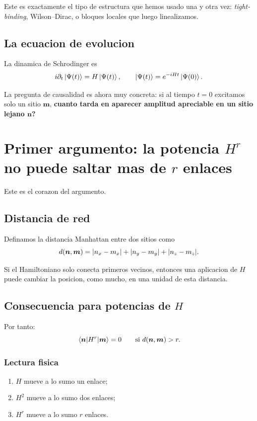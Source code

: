 Este es exactamente el tipo de estructura que hemos usado una y otra vez: \textit{tight-binding}, Wilson--Dirac, o bloques locales que luego linealizamos.

\subsection{La ecuacion de evolucion}
La dinamica de Schrodinger es
\begin{equation}
i\partial_t \ket{\Psi(t)} = H\ket{\Psi(t)},
\qquad
\ket{\Psi(t)} = e^{-iHt}\ket{\Psi(0)}.
\label{c19:eq:evol}
\end{equation}

La pregunta de causalidad es ahora muy concreta: si al tiempo \(t=0\) excitamos solo un sitio \(\bm{m}\), \textbf{cuanto tarda en aparecer amplitud apreciable en un sitio lejano \(\bm{n}\)?}

\section{Primer argumento: la potencia \(H^r\) no puede saltar mas de \(r\) enlaces}
Este es el corazon del argumento.

\subsection{Distancia de red}
Definamos la distancia Manhattan entre dos sitios como
\begin{equation}
d(\bm{n},\bm{m}) = \abs{n_x-m_x}+\abs{n_y-m_y}+\abs{n_z-m_z}.
\label{c19:eq:dist}
\end{equation}

Si el Hamiltoniano solo conecta primeros vecinos, entonces una aplicacion de \(H\) puede cambiar la posicion, como mucho, en una unidad de esta distancia.

\subsection{Consecuencia para potencias de \(H\)}
Por tanto:
\begin{equation}
\mel{\bm{n}}{H^r}{\bm{m}} = 0
\qquad
\text{si } d(\bm{n},\bm{m}) > r.
\label{c19:eq:Hrzero}
\end{equation}

\subsubsection*{Lectura fisica}
\begin{enumerate}[label=\arabic*.]
    \item \(H\) mueve a lo sumo un enlace;
    \item \(H^2\) mueve a lo sumo dos enlaces;
    \item \(H^r\) mueve a lo sumo \(r\) enlaces.
\end{enumerate}

